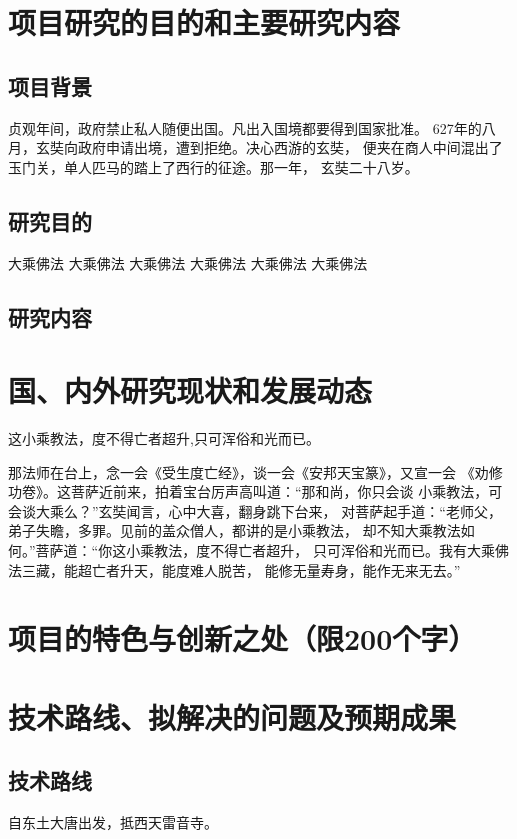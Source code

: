 \documentclass[12pt,a4paper,titlepage]{article}
\begin{document}
\newpage

\setlength{\parskip}{6pt plus0.5pt minus0.5pt}  %
\setlength{\parindent}{2em}
\normalsize
\section{项目研究的目的和主要研究内容}
\subsection{项目背景}
贞观年间，政府禁止私人随便出国。凡出入国境都要得到国家批准。
627年的八月，玄奘向政府申请出境，遭到拒绝。决心西游的玄奘，
便夹在商人中间混出了玉门关，单人匹马的踏上了西行的征途。那一年，
玄奘二十八岁。

\subsection{研究目的}
大乘佛法 大乘佛法 大乘佛法 大乘佛法 大乘佛法 大乘佛法

\subsection{研究内容}


\section{国、内外研究现状和发展动态}

这小乘教法，度不得亡者超升,只可浑俗和光而已。


那法师在台上，念一会《受生度亡经》，谈一会《安邦天宝篆》，又宣一会
《劝修功卷》。这菩萨近前来，拍着宝台厉声高叫道：“那和尚，你只会谈
小乘教法，可会谈大乘么？”玄奘闻言，心中大喜，翻身跳下台来，
对菩萨起手道：“老师父，弟子失瞻，多罪。见前的盖众僧人，都讲的是小乘教法，
却不知大乘教法如何。”菩萨道：“你这小乘教法，度不得亡者超升，
只可浑俗和光而已。我有大乘佛法三藏，能超亡者升天，能度难人脱苦，
能修无量寿身，能作无来无去。”

\section{项目的特色与创新之处（限200个字）}


\section{技术路线、拟解决的问题及预期成果}
\subsection{技术路线}
  自东土大唐出发，抵西天雷音寺。
\end{document}
